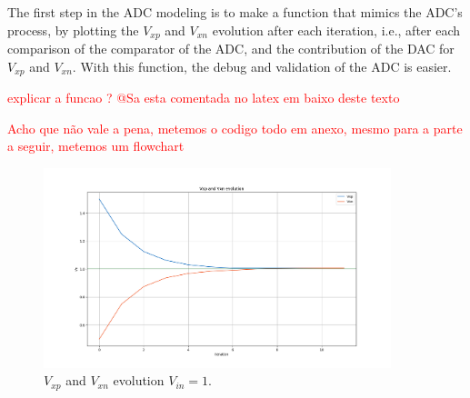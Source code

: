 The first step in the ADC modeling is to make a function that mimics the ADC's process, by plotting the $V_{xp}$ and $V_{xn}$ evolution after each iteration, i.e., after each comparison of the comparator of the ADC, and the contribution of the DAC for $V_{xp}$ and $V_{xn}$. With this function, the debug and validation of the ADC is easier.

\textcolor{red}{explicar a funcao ? @Sa esta comentada no latex em baixo deste texto}

\textcolor{red}{Acho que não vale a pena, metemos o codigo todo em anexo, mesmo para a parte a seguir, metemos um flowchart}

\begin{figure}[h]

    \centering
    \includegraphics*[width=0.9\textwidth]{Images/Vxp_Vxn_evolution_1V_input.png}
    \caption{$V_{xp}$ and $V_{xn}$ evolution $V_{in} = 1$.}

    \label{fig:VxpVxnEvo}
\end{figure}

